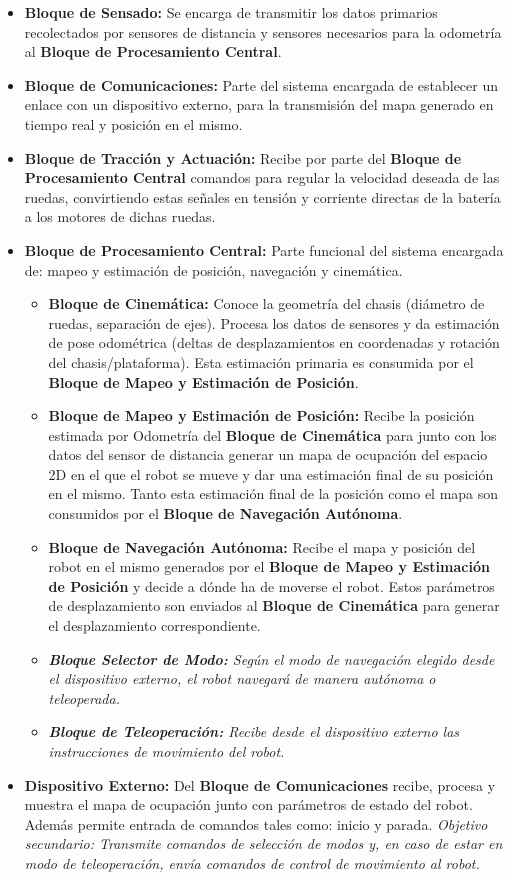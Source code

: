 \begin{itemize}
    \item \textbf{Bloque de Sensado:} Se encarga de transmitir los datos primarios recolectados por sensores de distancia y sensores necesarios para la odometría al \textbf{Bloque de Procesamiento Central}.
    \item \textbf{Bloque de Comunicaciones:} Parte del sistema encargada de establecer un enlace con un dispositivo externo, para la transmisión del mapa generado en tiempo real y posición en el mismo.
    \item \textbf{Bloque de Tracción y Actuación:} Recibe por parte del \textbf{Bloque de Procesamiento Central} comandos para regular la velocidad deseada de las ruedas, convirtiendo estas señales en tensión y corriente directas de la batería a los motores de dichas ruedas.
    \item \textbf{Bloque de Procesamiento Central:} Parte funcional del sistema encargada de: mapeo y estimación de posición, navegación y cinemática.
    \begin{itemize}
        \item \textbf{Bloque de Cinemática:} Conoce la geometría del chasis (diámetro de ruedas, separación de ejes). Procesa los datos de sensores y da estimación de pose odométrica (deltas de desplazamientos en coordenadas y rotación del chasis/plataforma). Esta estimación primaria es consumida por el \textbf{Bloque de Mapeo y Estimación de Posición}.
        \item \textbf{Bloque de Mapeo y Estimación de Posición:} Recibe la posición estimada por Odometría del \textbf{Bloque de Cinemática} para junto con los datos del sensor de distancia generar un mapa de ocupación del espacio 2D en el que el robot se mueve y dar una estimación final de su posición en el mismo. Tanto esta estimación final de la posición como el mapa son consumidos por el \textbf{Bloque de Navegación Autónoma}.
        \item \textbf{Bloque de Navegación Autónoma:} Recibe el mapa y posición del robot en el mismo generados por el \textbf{Bloque de Mapeo y Estimación de Posición} y decide a dónde ha de moverse el robot. Estos parámetros de desplazamiento son enviados al \textbf{Bloque de Cinemática} para generar el desplazamiento correspondiente. 
        \item \textit{\textbf{Bloque Selector de Modo:} Según el modo de navegación elegido desde el dispositivo externo, el robot navegará de manera autónoma o teleoperada.}
        \item \textit{\textbf{Bloque de Teleoperación:} Recibe desde el dispositivo externo las instrucciones de movimiento del robot.}
    \end{itemize}
    \item \textbf{Dispositivo Externo:} Del \textbf{Bloque de Comunicaciones} recibe, procesa y muestra el mapa de ocupación junto con parámetros de estado del robot. Además permite entrada de comandos tales como: inicio y parada. \textit{Objetivo secundario: Transmite comandos de selección de modos y, en caso de estar en modo de teleoperación, envía comandos de control de movimiento al robot.}
\end{itemize}

